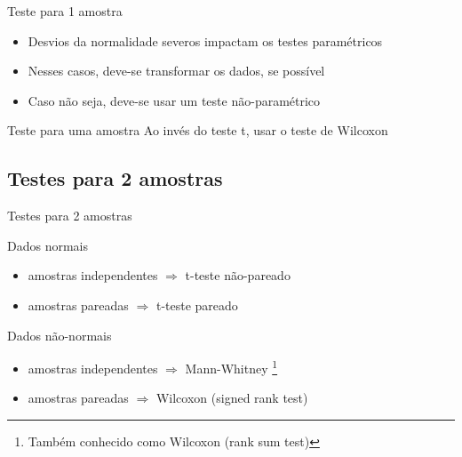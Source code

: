 \documentclass{beamer}
\begin{document}
\begin{frame}{Teste para 1 amostra}
  \begin{itemize}
  \item Desvios da normalidade severos impactam os testes paramétricos
  \item Nesses casos, deve-se transformar os dados, se possível
  \item Caso não seja, deve-se usar um teste não-paramétrico
  \end{itemize}
  \begin{block}{Teste para uma amostra}
    Ao invés do teste t, usar o teste de Wilcoxon
  \end{block}
\end{frame}

\subsection[2 médias]{Testes para 2 amostras}

\begin{frame}{Testes para 2 amostras}
  \begin{block}{Dados normais}
    \begin{itemize}
    \item amostras independentes $\Rightarrow$ t-teste não-pareado
    \item amostras pareadas $\Rightarrow$ t-teste pareado
    \end{itemize}
  \end{block}
  \begin{block}{Dados não-normais}
    \begin{itemize}
    \item amostras independentes $\Rightarrow$ Mann-Whitney \footnote{Também conhecido como Wilcoxon (rank sum test)}
    \item amostras pareadas $\Rightarrow$ Wilcoxon (signed rank test)
    \end{itemize}
  \end{block}
\end{frame}
\end{document}
